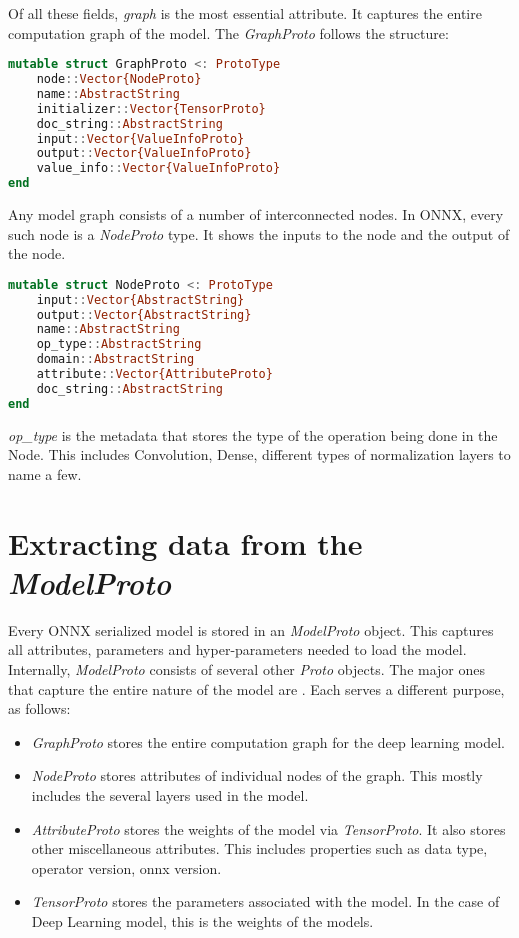 \documentclass{juliacon}
\begin{document}
Of all these fields, \textit{graph} is the most essential attribute. It captures the entire computation graph of the model. The \textit{GraphProto} follows the structure:

\begin{lstlisting}[language=julia]
mutable struct GraphProto <: ProtoType
    node::Vector{NodeProto}
    name::AbstractString
    initializer::Vector{TensorProto}
    doc_string::AbstractString
    input::Vector{ValueInfoProto}
    output::Vector{ValueInfoProto}
    value_info::Vector{ValueInfoProto}
end
\end{lstlisting}{}

Any model graph consists of a number of interconnected nodes. In ONNX, every such node is a \textit{NodeProto} type. It shows the inputs to the node and the output of the node.

\begin{lstlisting}[language=julia]
mutable struct NodeProto <: ProtoType
    input::Vector{AbstractString}
    output::Vector{AbstractString}
    name::AbstractString
    op_type::AbstractString
    domain::AbstractString
    attribute::Vector{AttributeProto}
    doc_string::AbstractString
end
\end{lstlisting}{}

\textit{op\_type} is the metadata that stores the type of the operation being done in the Node. This includes Convolution, Dense, different types of normalization layers to name a few.

\section{Extracting data from the \textit{ModelProto}}
\label{sec:documentclass}
%
Every ONNX serialized model is stored in an \textit{ModelProto} object. This captures all attributes, parameters and hyper-parameters needed to load the model. Internally, \textit{ModelProto} consists of several other \textit{Proto} objects. The major ones that capture the entire nature of the model are . Each serves a different purpose, as follows:

\begin{itemize}
    \item \textit{GraphProto} stores the entire computation graph for the deep learning model. \newline
    \item \textit{NodeProto} stores attributes of individual nodes of the graph. This mostly includes the several layers used in the model. \newline
    \item \textit{AttributeProto} stores the weights of the model via \textit{TensorProto}. It also stores other miscellaneous attributes. This includes properties such as data type, operator version, onnx version. \newline
    \item \textit{TensorProto} stores the parameters associated with the model. In the case of Deep Learning model, this is the weights of the models.
\end{itemize}
\end{document}
